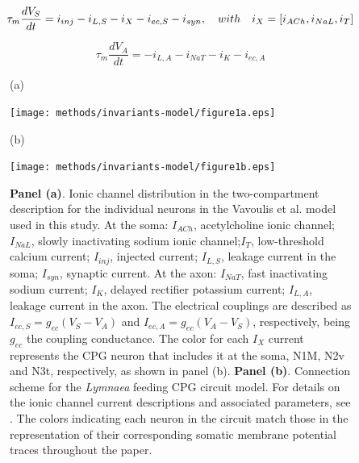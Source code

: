 \begin{equation}
	\tau_m\frac{dV_S}{dt} = i_{inj} - i_{L,S} - i_X - i_{ec,S} - i_{syn} \\,
	\quad with \quad i_X = [i_{ACh},i_{NaL},i_T]
	\label{eq:soma}
\end{equation}

\begin{equation}
	\tau_m\frac{dV_A}{dt} = -i_{L,A} - i_{NaT} - i_K - i_{ec,A}
	\label{eq:axon}
\end{equation}


\begin{figure}
\centering
\begin{minipage}[t]{0.45\textwidth}
	\raggedright
	(a) \par
	\vspace{75pt}
	\texttt{[image: methods/invariants-model/figure1a.eps]}
\end{minipage}\hfill
\begin{minipage}[t]{0.45\textwidth}
	\raggedright
	(b) \par
	\texttt{[image: methods/invariants-model/figure1b.eps]}
\end{minipage}
	\caption{\textbf{Panel (a)}. Ionic channel distribution in the two-compartment description for the individual neurons in the Vavoulis et al. model \cite{Vavoulis2007} used in this study. At the soma: $I_{ACh}$, acetylcholine ionic channel; $I_{NaL}$, slowly inactivating sodium
		ionic channel;$I_T$, low-threshold calcium current; $I_{inj}$, injected current; $I_{L,S}$, leakage current in the soma; $I_{syn}$, synaptic current. At the axon: $I_{NaT}$, fast inactivating sodium current; $I_K$, delayed rectifier potassium current; $I_{L,A}$, leakage current in the axon. The electrical couplings are described as $I_{ec,S}=g_{ec}(V_S-V_A)$ and $I_{ec,A}=g_{ec}(V_A-V_S)$, respectively, being $g_{ec}$ the coupling conductance. The color for each $I_X$ current represents the CPG neuron that includes it at the soma,  N1M, N2v and N3t, respectively, as shown in panel (b). 
		\textbf{Panel (b)}. Connection scheme for the {\sl Lymnaea} feeding CPG circuit model. For details on the ionic channel current descriptions and associated parameters, see \cite{Vavoulis2007}. The colors indicating each neuron in the circuit match those in the representation of their corresponding somatic membrane potential traces throughout the paper. 
	}
	\label{fig:CPG diagram 2 compartments}
\end{figure}

\vspace{0.3in}

